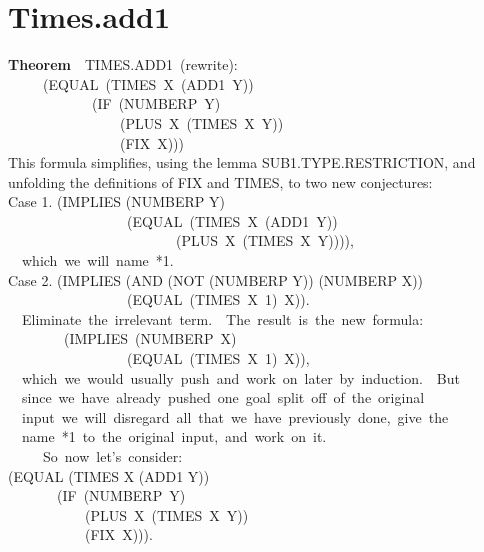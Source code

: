 \documentclass[10pt]{book}
\newenvironment{pubasis}{\begin{flushleft}}{\end{flushleft}}
\newcommand{\axiomordefinition}[1]{\vspace{6pt}\Large\textsf{\textbf{#1}}\normalsize}
\begin{document}
\section{Times.add1}
\begin{pubasis}
\axiomordefinition{Theorem}~~TIMES.ADD1~(rewrite):\\
~~~~~(EQUAL~(TIMES~X~(ADD1~Y))\\
~~~~~~~~~~~~(IF~(NUMBERP~Y)\\
~~~~~~~~~~~~~~~~(PLUS~X~(TIMES~X~Y))\\
~~~~~~~~~~~~~~~~(FIX~X)))\\

This formula simplifies, using the lemma SUB1.TYPE.RESTRICTION, and\\
unfolding the definitions of FIX and TIMES, to two new conjectures:\\

Case 1.	(IMPLIES (NUMBERP Y)\\
~~~~~~~~~~~~~~~~~(EQUAL~(TIMES~X~(ADD1~Y))\\
~~~~~~~~~~~~~~~~~~~~~~~~(PLUS~X~(TIMES~X~Y)))),\\

~~which~we~will~name~*1.\\

Case 2.	(IMPLIES (AND (NOT (NUMBERP Y)) (NUMBERP X))\\
~~~~~~~~~~~~~~~~~(EQUAL~(TIMES~X~1)~X)).\\

~~Eliminate~the~irrelevant~term.~~The~result~is~the~new~formula:\\

~~~~~~~~(IMPLIES~(NUMBERP~X)\\
~~~~~~~~~~~~~~~~~(EQUAL~(TIMES~X~1)~X)),\\

~~which~we~would~usually~push~and~work~on~later~by~induction.~~But\\
~~since~we~have~already~pushed~one~goal~split~off~of~the~original\\
~~input~we~will~disregard~all~that~we~have~previously~done,~give~the\\
~~name~*1~to~the~original~input,~and~work~on~it.\\

~~~~~So~now~let's~consider:\\

(EQUAL (TIMES X (ADD1 Y))\\
~~~~~~~(IF~(NUMBERP~Y)\\
~~~~~~~~~~~(PLUS~X~(TIMES~X~Y))\\
~~~~~~~~~~~(FIX~X))).\\


\end{pubasis}
\end{document}
